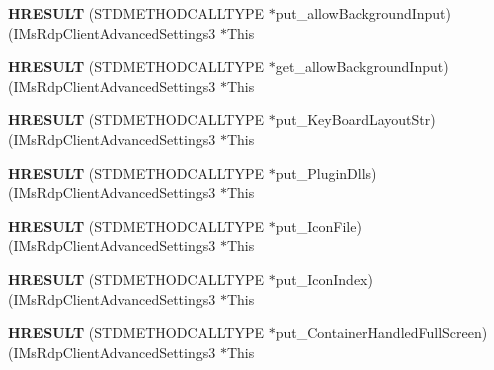 \begin{DoxyCompactItemize}
{\bfseries H\+R\+E\+S\+U\+LT} (S\+T\+D\+M\+E\+T\+H\+O\+D\+C\+A\+L\+L\+T\+Y\+PE $\ast$put\+\_\+allow\+Background\+Input)(I\+Ms\+Rdp\+Client\+Advanced\+Settings3 $\ast$This
\item 
\mbox{\label{struct_i_ms_rdp_client_advanced_settings3_vtbl_a6b4aff68558c212c2a71485ca58f4d34}} 
{\bfseries H\+R\+E\+S\+U\+LT} (S\+T\+D\+M\+E\+T\+H\+O\+D\+C\+A\+L\+L\+T\+Y\+PE $\ast$get\+\_\+allow\+Background\+Input)(I\+Ms\+Rdp\+Client\+Advanced\+Settings3 $\ast$This
\item 
\mbox{\label{struct_i_ms_rdp_client_advanced_settings3_vtbl_a306342a688c1cd488a72a8cc01f9c263}} 
{\bfseries H\+R\+E\+S\+U\+LT} (S\+T\+D\+M\+E\+T\+H\+O\+D\+C\+A\+L\+L\+T\+Y\+PE $\ast$put\+\_\+\+Key\+Board\+Layout\+Str)(I\+Ms\+Rdp\+Client\+Advanced\+Settings3 $\ast$This
\item 
\mbox{\label{struct_i_ms_rdp_client_advanced_settings3_vtbl_a5a64ebed15e63a3a42022d78a0ad9b56}} 
{\bfseries H\+R\+E\+S\+U\+LT} (S\+T\+D\+M\+E\+T\+H\+O\+D\+C\+A\+L\+L\+T\+Y\+PE $\ast$put\+\_\+\+Plugin\+Dlls)(I\+Ms\+Rdp\+Client\+Advanced\+Settings3 $\ast$This
\item 
\mbox{\label{struct_i_ms_rdp_client_advanced_settings3_vtbl_a16bf287ca85679e081b1d2fb1dedb1c6}} 
{\bfseries H\+R\+E\+S\+U\+LT} (S\+T\+D\+M\+E\+T\+H\+O\+D\+C\+A\+L\+L\+T\+Y\+PE $\ast$put\+\_\+\+Icon\+File)(I\+Ms\+Rdp\+Client\+Advanced\+Settings3 $\ast$This
\item 
\mbox{\label{struct_i_ms_rdp_client_advanced_settings3_vtbl_a6606084a689afbdfa6d6dfbb84b5f51d}} 
{\bfseries H\+R\+E\+S\+U\+LT} (S\+T\+D\+M\+E\+T\+H\+O\+D\+C\+A\+L\+L\+T\+Y\+PE $\ast$put\+\_\+\+Icon\+Index)(I\+Ms\+Rdp\+Client\+Advanced\+Settings3 $\ast$This
\item 
\mbox{\label{struct_i_ms_rdp_client_advanced_settings3_vtbl_abe61b92a558ec2362c1532d17a8d0702}} 
{\bfseries H\+R\+E\+S\+U\+LT} (S\+T\+D\+M\+E\+T\+H\+O\+D\+C\+A\+L\+L\+T\+Y\+PE $\ast$put\+\_\+\+Container\+Handled\+Full\+Screen)(I\+Ms\+Rdp\+Client\+Advanced\+Settings3 $\ast$This

\end{DoxyCompactItemize}
